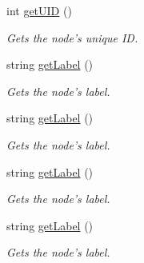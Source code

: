 \begin{DoxyCompactItemize}
int \hyperlink{classAST_ab7a5b1d9f1c2de0d98deb356f724a42c}{get\-U\-I\-D} ()
\begin{DoxyCompactList}\small\item\em Gets the node's unique I\-D. \end{DoxyCompactList}\item 
string \hyperlink{classAST_aee029be902fffc927d16ccb03eb922ad}{get\-Label} ()
\begin{DoxyCompactList}\small\item\em Gets the node's label. \end{DoxyCompactList}\item 
string \hyperlink{classAST_aee029be902fffc927d16ccb03eb922ad}{get\-Label} ()
\begin{DoxyCompactList}\small\item\em Gets the node's label. \end{DoxyCompactList}\item 
string \hyperlink{classAST_aee029be902fffc927d16ccb03eb922ad}{get\-Label} ()
\begin{DoxyCompactList}\small\item\em Gets the node's label. \end{DoxyCompactList}\item 
string \hyperlink{classAST_aee029be902fffc927d16ccb03eb922ad}{get\-Label} ()
\begin{DoxyCompactList}\small\item\em Gets the node's label. \end{DoxyCompactList}\end{DoxyCompactItemize}
